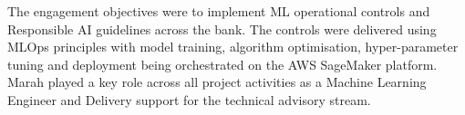 \documentclass[10pt,a4paper,ragged2e,withhyper]{altacv}
\begin{document}
\divider

The engagement objectives were to implement ML operational controls and Responsible AI guidelines across the bank. The controls were delivered using MLOps principles with model training, algorithm optimisation, hyper-parameter tuning and deployment being orchestrated on the AWS SageMaker platform. Marah played a key role across all project activities as a Machine Learning Engineer and Delivery support for the technical advisory stream.

\medskip


\end{document}
